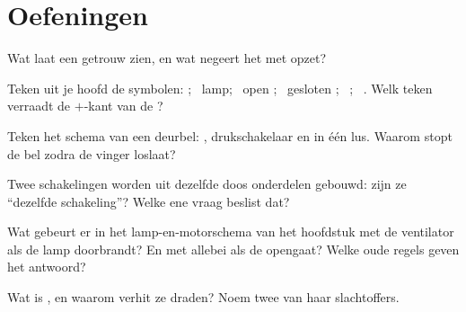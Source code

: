 \section{Oefeningen}

\begin{exercise}[$\star$]\label{exo:g6:circuits-and-safety:1}
Wat laat een  getrouw zien, en wat negeert het met
opzet?
\end{exercise}

\begin{exercise}[$\star$]\label{exo:g6:circuits-and-safety:2}
Teken uit je hoofd de symbolen: ; \ lamp; \ open
; \ gesloten ; \ ; \ . Welk teken
verraadt de $+$-kant van de ?
\end{exercise}

\begin{exercise}[$\star$]\label{exo:g6:circuits-and-safety:3}
Teken het schema van een deurbel: , drukschakelaar en
 in één lus. Waarom stopt de bel zodra de vinger loslaat?
\end{exercise}

\begin{exercise}[$\star$]\label{exo:g6:circuits-and-safety:4}
Twee schakelingen worden uit dezelfde doos onderdelen gebouwd: zijn ze
``dezelfde schakeling''? Welke ene vraag beslist dat?
\end{exercise}

\begin{exercise}[$\star$]\label{exo:g6:circuits-and-safety:5}
Wat gebeurt er in het lamp-en-motorschema van het hoofdstuk met de
ventilator als de lamp doorbrandt? En met allebei als de
 opengaat? Welke oude regels geven het antwoord?
\end{exercise}

\begin{exercise}[$\star$]\label{exo:g6:circuits-and-safety:6}
Wat is , en waarom verhit ze draden? Noem twee van haar
slachtoffers.
\end{exercise}

